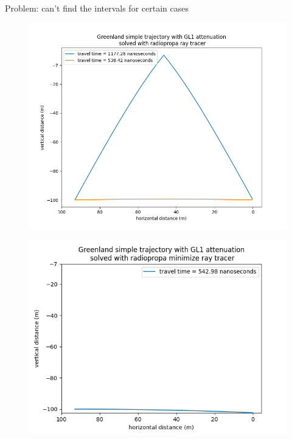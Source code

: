\documentclass{beamer}
\begin{document}
\begin{frame}
	\centering
	Problem: can't find the intervals for certain cases
\end{frame}
\begin{frame}
	\begin{figure}
		\includegraphics[width=\textwidth]{figures/iterative.png}
	\end{figure}
\end{frame}
\begin{frame}
	\begin{figure}
		\includegraphics[width=\textwidth]{figures/minimize.png}
	\end{figure}
\end{frame}
\end{document}
